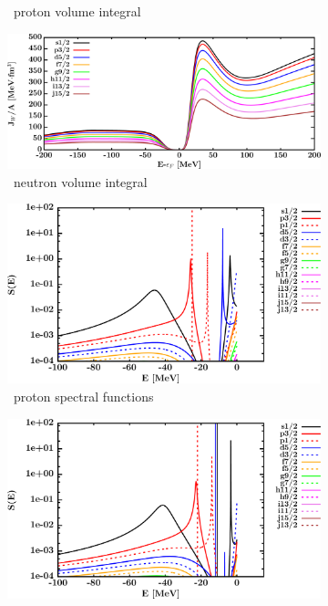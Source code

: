 \begin{figure}[hbtp]
\begin{subfigure}[b]{0.45\textwidth}
        \caption{\oEight\ proton volume integral}
        \label{DOMFitData_o18_proton_potentialIntegral}
    \end{subfigure}\hspace{6pt}
    \begin{subfigure}[b]{0.45\textwidth}
        \centering
        \includegraphics[width=\linewidth]{figures/o18_neutronVolumeIntegrals.png}
        \caption{\oEight\ neutron volume integral}
        \label{DOMFitData_o18_neutron_potentialIntegral}
    \end{subfigure}\vspace{0.3in}
    \begin{subfigure}[b]{0.45\textwidth}
        \centering
        \includegraphics[width=\linewidth]{figures/o18_protonSpectralFunctions.png}
        \caption{\oEight\ proton spectral functions}
        \label{DOMFitData_o18_proton_spectralFunctions}
    \end{subfigure}\hspace{6pt}
    \begin{subfigure}[b]{0.45\textwidth}
        \centering
        \includegraphics[width=\linewidth]{figures/o18_neutronSpectralFunctions.png}

\end{subfigure}
\end{figure}
